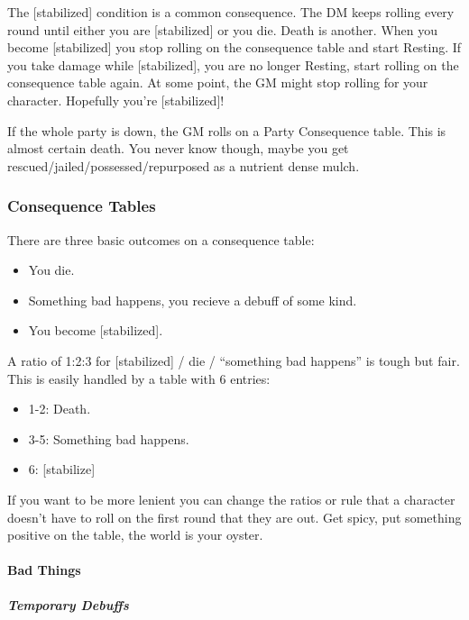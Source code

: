 \documentclass[
  letterpaper,
  DIV=11,
  numbers=noendperiod]{scrartcl}
\let\oldparagraph\paragraph
\renewcommand{\paragraph}[1]{\oldparagraph{#1}\mbox{}}
\let\oldsubparagraph\subparagraph
\renewcommand{\subparagraph}[1]{\oldsubparagraph{#1}\mbox{}}
\providecommand{\tightlist}{%
  \setlength{\itemsep}{0pt}\setlength{\parskip}{0pt}}\usepackage{longtable,booktabs,array}
\begin{document}
The {[}stabilized{]} condition is a common consequence. The DM keeps
rolling every round until either you are {[}stabilized{]} or you die.
Death is another. When you become {[}stabilized{]} you stop rolling on
the consequence table and start Resting. If you take damage while
{[}stabilized{]}, you are no longer Resting, start rolling on the
consequence table again. At some point, the GM might stop rolling for
your character. Hopefully you're {[}stabilized{]}!

If the whole party is down, the GM rolls on a Party Consequence table.
This is almost certain death. You never know though, maybe you get
rescued/jailed/possessed/repurposed as a nutrient dense mulch.

\subsubsection{Consequence Tables}\label{consequence-tables}

There are three basic outcomes on a consequence table:

\begin{itemize}
\tightlist
\item
  You die.
\item
  Something bad happens, you recieve a debuff of some kind.
\item
  You become {[}stabilized{]}.
\end{itemize}

A ratio of 1:2:3 for {[}stabilized{]} / die / ``something bad happens''
is tough but fair. This is easily handled by a table with 6 entries:

\begin{itemize}
\tightlist
\item
  1-2: Death.
\item
  3-5: Something bad happens.
\item
  6: {[}stabilize{]}
\end{itemize}

If you want to be more lenient you can change the ratios or rule that a
character doesn't have to roll on the first round that they are out. Get
spicy, put something positive on the table, the world is your oyster.

\paragraph{Bad Things}\label{bad-things}

\subparagraph{Temporary Debuffs}\label{temporary-debuffs}
\end{document}
